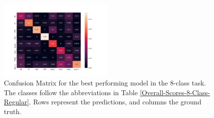 \documentclass[usenatbib]{mnras}
\begin{document}


\begin{figure}
	\includegraphics[width=0.5\textwidth]{normalizedCM.png}
  \caption{Confusion Matrix for the best performing model in the 8-class
  task. The classes follow the abbreviations in Table \ref{Overall-Scores-8-Class-Regular}. Rows represent the predictions, and columns the ground truth.}
  \label{fig:normalized8ClassCM}
\end{figure} 
\end{document}
